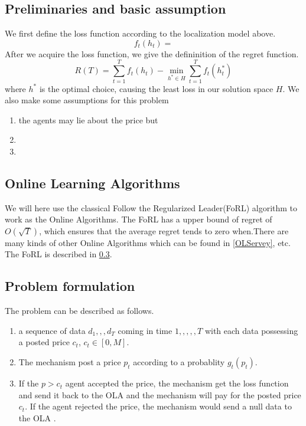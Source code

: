 \documentclass[10pt,conference,compsocconf,letterpaper]{IEEEtran}
\begin{document}
\subsection{Preliminaries and basic assumption}
We first define the loss function according to the localization model above.
\begin{equation}
f_t(h_t)=
\end{equation}
 After we acquire the loss function, we give the defininition of the regret function.
\[R(T)=\sum_{t=1}^Tf_t(h_t)-\min_{h^*\in H}\sum_{t=1}^Tf_t(h^*_t)\]
where $h^*$ is the optimal choice, causing the least loss in our solution space $H$.
We also make some assumptions for this problem
\begin{enumerate}
\item the agents may lie about the price but 
\item 
\item 
\end{enumerate}
\subsection{Online Learning Algorithms}
We will here use the classical Follow the Regularized Leader(FoRL) algorithm to work as the Online Algorithms. The FoRL has a upper bound of regret of $O(\sqrt{T})$, which ensures that the average regret tends to zero when.There are many kinds of other Online Algorithms which can be found in \ref{OLServey}, etc. The FoRL is described in \ref{}.
\begin{algorithm}
\end{algorithm}
\subsection{Problem formulation}
The problem can be described as follows. 
\begin{enumerate}
\item a sequence of data ${d_1,,,d_T}$ coming in time $1,,,,,T$ with each data possessing a posted price $c_t$, $c_t\in [0,M]$. 
\item The mechanism post a price $p_t$ according to a probablity $g_t(p_t)$. 
\item If the $p>c_t$ agent accepted the price, the mechanism get the loss function and send it back to the OLA and the mechanism will pay for the posted price $c_t$. If the agent rejected the price, the mechanism would send a null data to the OLA . 
\end{enumerate}
\end{document}
